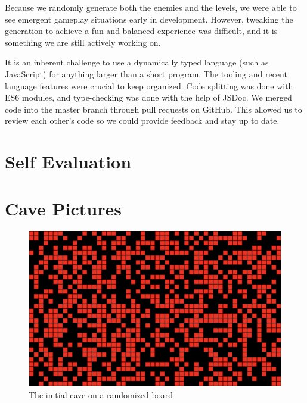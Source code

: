 \documentclass[a4paper, 12pt]{article}
\begin{document}
Because we randomly generate both the enemies and the levels, we were able to
see emergent gameplay situations early in development. However, tweaking the
generation to achieve a fun and balanced experience was difficult, and it is
something we are still actively working on.

It is an inherent challenge to use a dynamically typed language (such as
JavaScript) for anything larger than a short program. The tooling and recent
language features were crucial to keep organized. Code splitting was done with
ES6 modules, and type-checking was done with the help of JSDoc. We merged code
into the master branch through pull requests on GitHub. This allowed us to
review each other's code so we could provide feedback and stay up to date.

\section{Self Evaluation}

\section{Cave Pictures}
\label{sec:cavePictures}

\begin{figure}[h]
	\centering
	\includegraphics[width=\textwidth]{initial-cave.png}
	\caption{The initial cave on a randomized board}
	\label{fig:initialCave}
\end{figure}
\end{document}
